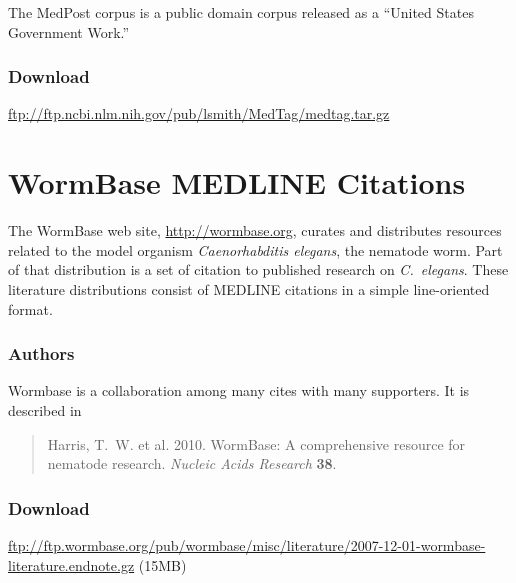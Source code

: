 The MedPost corpus is a public domain corpus released as a ``United
States Government Work.''

\subsubsection{Download}

\url{ftp://ftp.ncbi.nlm.nih.gov/pub/lsmith/MedTag/medtag.tar.gz}




\section{WormBase MEDLINE Citations}\label{section:corpora-wormbase}

The WormBase web site, \url{http://wormbase.org}, curates and distributes
resources related to the model organism {\it Caenorhabditis elegans},
the nematode worm.  Part of that distribution is a set of citation to
published research on {\it C.~elegans}.  These literature
distributions consist of MEDLINE citations in a simple line-oriented
format.

\subsubsection{Authors}

Wormbase is a collaboration among many cites with many supporters.
It is described in 
%
\begin{quote}
Harris, T.~W. et al. 2010. WormBase: A comprehensive resource for
nematode research. {\it Nucleic Acids Research} {\bf 38}.
\end{quote}

\subsubsection{Download}

\url{ftp://ftp.wormbase.org/pub/wormbase/misc/literature/2007-12-01-wormbase-literature.endnote.gz} (15MB)

